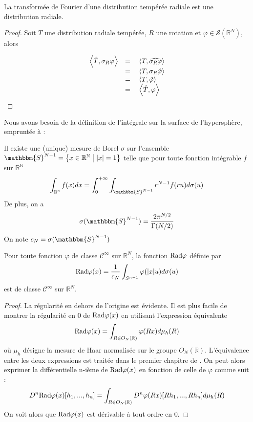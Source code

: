 \documentclass[11pt,a4paper]{article}
\begin{document}
\begin{Prop} La transformée de Fourier d'une distribution tempérée radiale est une distribution radiale. 
\end{Prop}
\begin{proof} Soit $T$ une distribution radiale tempérée, $R$ une rotation et $\varphi \in \mathcal{S}(\mathbb{R}^N)$, alors

\[\begin{array}{ll}
\left\langle \hat{T},\sigma_R\varphi\right\rangle &= \quad\left\langle T,\widehat{\sigma_R\varphi}\right\rangle\\
 &= \quad\left\langle T,\sigma_R\hat{\varphi}\right\rangle\\
 &= \quad\left\langle T,\hat{\varphi}\right\rangle\\
 &= \quad\left\langle \hat{T},\varphi\right\rangle
\end{array}\]


\end{proof}

Nous avons besoin de la définition de l'intégrale sur la surface de l'hypersphère, empruntée à \cite[p.78]{MR1681462} : 
\begin{Prop} Il existe une (unique) mesure de Borel $\sigma$ sur l'ensemble $\mathbbm{S}^{N-1} = \enstq{x  \in \mathbb{R^N}}{|x| = 1}$  telle que pour toute fonction intégrable $f$ sur $\mathbb{R^N}$ \[\int_{\mathbb{R^N}}f(x)dx = \int_{0}^{+\infty} \int_{\mathbbm{S}^{N-1}}r^{N-1}f(ru)d\sigma(u)\]
De plus, on a \[\sigma(\mathbbm{S}^{N-1}) = \frac{2\pi^{N/2}}{\Gamma(N/2)}\]
On note $c_N = \sigma(\mathbbm{S}^{N-1})$
\end{Prop}

\begin{Prop} Pour toute fonction $\varphi$ de classe $\mathcal{C}^\infty$ sur $\mathbb{R}^N$, la fonction $\textup{Rad}{\varphi}$ définie par \[ \textup{Rad}{\varphi}(x) = \frac{1}{c_N}\int_{S^{n-1}}\varphi(|x|u)d\sigma(u)\]
est de classe $\mathcal{C}^\infty$ sur $\mathbb{R}^N$. 

\begin{proof}
La régularité en dehors de l'origine est évidente. 
Il est plus facile de montrer la régularité en $0$ de $\textup{Rad}{\varphi}(x)$ en utilisant l'expression équivalente \[\textup{Rad}{\varphi}(x) = \int_{R\in O_N(\mathbb{R})} \varphi(Rx) d\mu_h (R)\]
où $\mu_h$ désigne la mesure de Haar normalisée sur le groupe $O_N(\mathbb{R})$. L'équivalence entre les deux expressions est traitée dans le premier chapitre de \cite{milman2009asymptotic}. On peut alors exprimer la différentielle n-ième de $\textup{Rad}{\varphi}(x)$ en fonction de celle de $\varphi$ comme suit : \[D^n\textup{Rad}{\varphi}(x)[h_1,...,h_n] = \int_{R\in O_N(\mathbb{R})} D^n\varphi(Rx)[Rh_1,...,Rh_n]d\mu_h(R)\]
On voit alors que $\textup{Rad}{\varphi}(x)$ est dérivable à tout ordre en $0$.
\end{proof}

\end{Prop}
\end{document}
